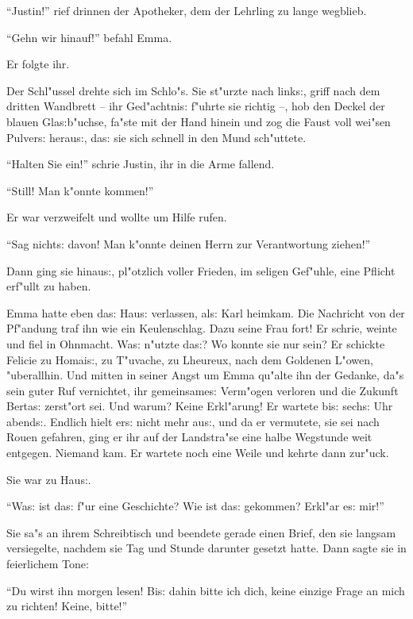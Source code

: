 \documentclass[oneside,12pt]{book}
\newcommand{\s}{s:}%
\begin{document}
"`Justin!"' rief drinnen der Apotheker, dem der Lehrling zu lange
wegblieb.

"`Gehn wir hinauf!"' befahl Emma.

Er folgte ihr.

Der Schl"ussel drehte sich im Schlo"s. Sie st"urzte nach link{\s},
griff nach dem dritten Wandbrett -- ihr Ged"achtni{\s} f"uhrte sie
richtig --, hob den Deckel der blauen Gla{\s}b"uchse, fa"ste mit
der Hand hinein und zog die Faust voll wei"sen Pulver{\s}
herau{\s}, da{\s} sie sich schnell in den Mund sch"uttete.

"`Halten Sie ein!"' schrie Justin, ihr in die Arme fallend.

"`Still! Man k"onnte kommen!"'

Er war verzweifelt und wollte um Hilfe rufen.

"`Sag nicht{\s} davon! Man k"onnte deinen Herrn zur Verantwortung
ziehen!"'

Dann ging sie hinau{\s}, pl"otzlich voller Frieden, im seligen
Gef"uhle, eine Pflicht erf"ullt zu haben.


\newpage\begin{center}
{\large \so{Neunte{\s} Kapitel}}\bigskip\bigskip
\end{center}

Emma hatte eben da{\s} Hau{\s} verlassen, al{\s} Karl heimkam. Die
Nachricht von der Pf"andung traf ihn wie ein Keulenschlag. Dazu
seine Frau fort! Er schrie, weinte und fiel in Ohnmacht. Wa{\s}
n"utzte da{\s}? Wo konnte sie nur sein? Er schickte Felicie zu
Homai{\s}, zu T"uvache, zu Lheureux, nach dem Goldenen L"owen,
"uberallhin. Und mitten in seiner Angst um Emma qu"alte ihn der
Gedanke, da"s sein guter Ruf vernichtet, ihr gemeinsame{\s}
Verm"ogen verloren und die Zukunft Berta{\s} zerst"ort sei. Und
warum? Keine Erkl"arung! Er wartete bi{\s} sech{\s} Uhr abend{\s}.
Endlich hielt er{\s} nicht mehr au{\s}, und da er vermutete, sie
sei nach Rouen gefahren, ging er ihr auf der Landstra"se eine
halbe Wegstunde weit entgegen. Niemand kam. Er wartete noch eine
Weile und kehrte dann zur"uck.

Sie war zu Hau{\s}.

"`Wa{\s} ist da{\s} f"ur eine Geschichte? Wie ist da{\s} gekommen?
Erkl"ar e{\s} mir!"'

Sie sa"s an ihrem Schreibtisch und beendete gerade einen Brief,
den sie langsam versiegelte, nachdem sie Tag und Stunde darunter
gesetzt hatte. Dann sagte sie in feierlichem Tone:

"`Du wirst ihn morgen lesen! Bi{\s} dahin bitte ich dich, keine
einzige Frage an mich zu richten! Keine, bitte!"'
\end{document}
